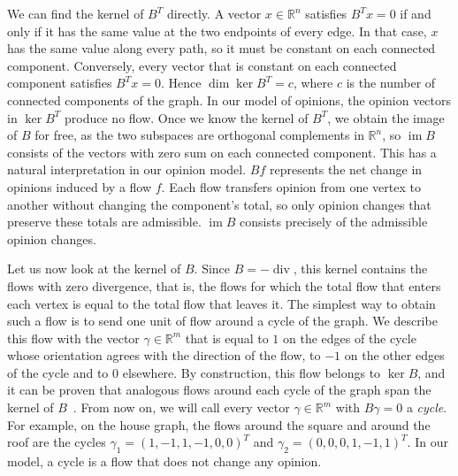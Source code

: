 \documentclass[11pt,a4paper]{article}
\theoremstyle{plain}
\theoremstyle{definition}
\newcommand{\R}{\mathbb{R}}
\newcommand{\im}{\operatorname{im}}
\begin{document}
We can find the kernel of $B^T$ directly. A vector $x\in\R^n$ satisfies $B^Tx=0$ if and only if it has the same value at the two endpoints of every edge. In that case, $x$ has the same value along every path, so it must be constant on each connected component. Conversely, every vector that is constant on each connected component satisfies $B^Tx=0$. Hence $\dim\ker B^T=c$, where $c$ is the number of connected components of the graph. In our model of opinions, the opinion vectors in $\ker B^T$ produce no flow. Once we know the kernel of $B^T$, we obtain the image of $B$ for free, as the two subspaces are orthogonal complements in $\R^n$, so $\im B$ consists of the vectors with zero sum on each connected component. This has a natural interpretation in our opinion model. $Bf$ represents the net change in opinions induced by a flow $f$. Each flow transfers opinion from one vertex to another without changing the component's total, so only opinion changes that preserve these totals are admissible. $\im B$ consists precisely of the admissible opinion changes.

Let us now look at the kernel of $B$. Since $B=-\operatorname{div}$, this kernel contains the flows with zero divergence, that is, the flows for which the total flow that enters each vertex is equal to the total flow that leaves it. The simplest way to obtain such a flow is to send one unit of flow around a cycle of the graph. We describe this flow with the vector $\gamma$$\in\R^m$ that is equal to $1$ on the edges of the cycle whose orientation agrees with the direction of the flow, to $-1$ on the other edges of the cycle and to $0$ elsewhere. By construction, this flow belongs to $\ker B$, and it can be proven that analogous flows around each cycle of the graph span the kernel of $B$~\cite{biggs1993}. From now on, we will call every vector $\gamma$$\in\R^m$ with $B\gamma=0$ a \emph{cycle}. For example, on the house graph, the flows around the square and around the roof are the cycles $\gamma_1$$=(1,-1,1,-1,0,0)^T$ and $\gamma_2$$=(0,0,0,1,-1,1)^T$. In our model, a cycle is a flow that does not change any opinion.
\end{document}
